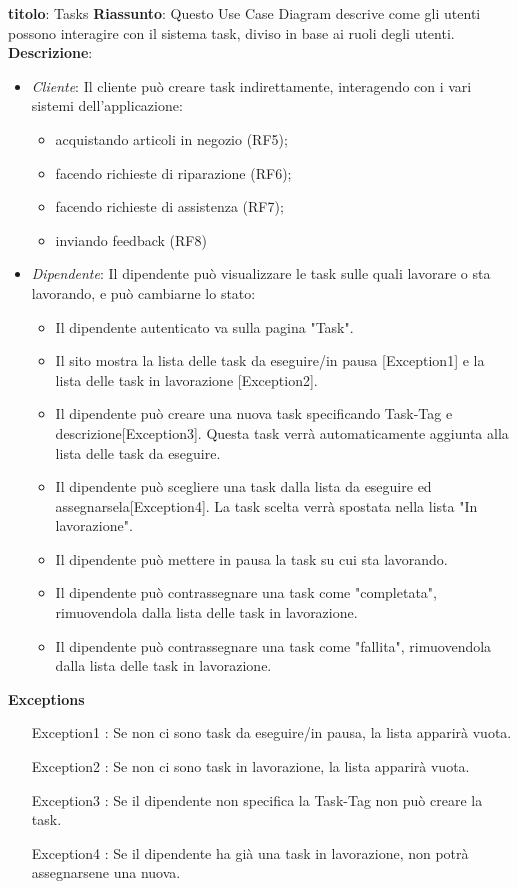\documentclass{report}
\begin{document}
\textbf{titolo}: Tasks\newline
\textbf{Riassunto}: Questo Use Case Diagram descrive come gli utenti possono interagire con il sistema task, diviso in base ai ruoli degli utenti.\newline
\textbf{Descrizione}: 
	\begin{itemize}
		\item \textit{Cliente}: Il cliente può creare task indirettamente, interagendo con i vari sistemi dell'applicazione:
		\begin{itemize}
			\item acquistando articoli in negozio (RF5);
			\item facendo richieste di riparazione (RF6);
			\item facendo richieste di assistenza (RF7);
			\item inviando feedback (RF8)
		\end{itemize}
		\item \textit{Dipendente}: Il dipendente può visualizzare le task sulle quali lavorare o sta lavorando, e può cambiarne lo stato:
		\begin{itemize}
			\item Il dipendente autenticato va sulla pagina "Task".
			\item Il sito mostra la lista delle task da eseguire/in pausa [Exception1] e la lista delle task in lavorazione [Exception2]. 
			\item Il dipendente può creare una nuova task specificando Task-Tag e descrizione[Exception3]. Questa task verrà automaticamente aggiunta alla lista delle task da eseguire.
			\item Il dipendente può scegliere una task dalla lista da eseguire ed assegnarsela[Exception4]. La task scelta verrà spostata nella lista "In lavorazione".  
			\item Il dipendente può mettere in pausa la task su cui sta lavorando.
			\item Il dipendente può contrassegnare una task come "completata", rimuovendola dalla lista delle task in lavorazione.
			\item Il dipendente può contrassegnare una task come "fallita", rimuovendola dalla lista delle task in lavorazione. 
		\end{itemize}
	\end{itemize}
\textbf{Exceptions}
\begin{itemize}
	\item [Exception1]: Se non ci sono task da eseguire/in pausa, la lista apparirà vuota.
	\item [Exception2]: Se non ci sono task in lavorazione, la lista apparirà vuota.
	\item [Exception3]: Se il dipendente non specifica la Task-Tag non può creare la task.
	\item [Exception4]: Se il dipendente ha già una task in lavorazione, non potrà assegnarsene una nuova.

\end{itemize}
\end{document}

